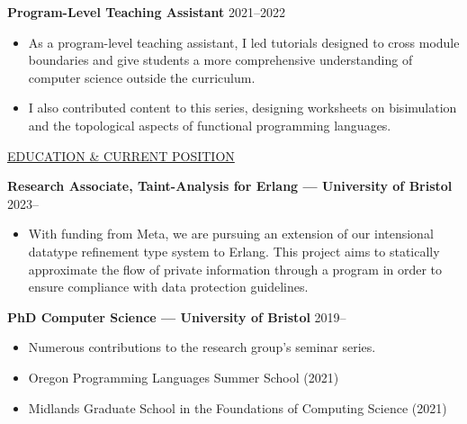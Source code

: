 \documentclass{letter}
\begin{document}
\textbf{Program-Level Teaching Assistant} \hfill 2021--2022
\begin{itemize}
  \item As a program-level teaching assistant, I led tutorials designed to cross module boundaries and give students a more comprehensive understanding of computer science outside the curriculum. %
  
  \item I also contributed content to this series, designing worksheets on bisimulation and the topological aspects of functional programming languages.
\end{itemize}

\pagebreak

\uline{{\large EDUCATION \& CURRENT POSITION}\hfill}

\vspace{5pt}

\textbf{Research Associate, Taint-Analysis for Erlang --- University of Bristol} \hfill 2023--\phantom{2023}
\vspace{-5pt}
\begin{itemize}
  \setlength\itemsep{0pt}
  \item With funding from Meta, we are pursuing an extension of our intensional datatype refinement type system to Erlang. This project aims to statically approximate the flow of private information through a program in order to ensure compliance with data protection guidelines.
\end{itemize}

\textbf{PhD Computer Science --- University of Bristol} \hfill 2019--\phantom{2023}
\vspace{-5pt}
\begin{itemize}
  \setlength\itemsep{0pt}
  \item Numerous contributions to the research group's seminar series.
  \item Oregon Programming Languages Summer School (2021)
  \item Midlands Graduate School in the Foundations of Computing Science (2021)
\end{itemize}
\end{document}
